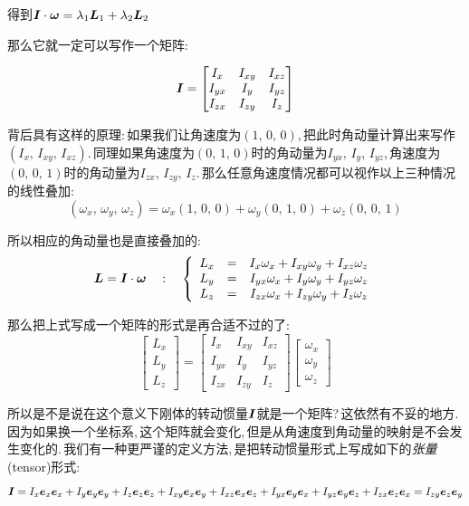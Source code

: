 得到$\boldsymbol{I}\cdot\boldsymbol{\omega}=\lambda_1 \boldsymbol{L}_1+\lambda_2 \boldsymbol{L}_2$

那么它就一定可以写作一个矩阵:

\[\boldsymbol{I}=\begin{bmatrix}I_{x}&I_{xy}&I_{xz}\\I_{yx}&I_{y}&I_{yz}\\I_{zx}&I_{zy}&I_{z}\end{bmatrix}\]

背后具有这样的原理:\,如果我们让角速度为$(1,\,0,\,0)$,\,把此时角动量计算出来写作$(I_x,\,I_{xy},\,I_{xz})$.\,同理如果角速度为$(0,\,1,\,0)$时的角动量为$I_{yx},\,I_{y},\,I_{yz}$,\,角速度为$(0,\,0,\,1)$时的角动量为$I_{zx},\,I_{zy},\,I_{z}$.\,那么任意角速度情况都可以视作以上三种情况的线性叠加:
\[(\omega_x,\,\omega_y,\,\omega_z)=\omega_x(1,\,0,\,0)+\omega_y(0,\,1,\,0)+\omega_z(0,\,0,\,1)\]

所以相应的角动量也是直接叠加的:
\[\boldsymbol{L}=\boldsymbol{I}\cdot\boldsymbol{\omega}\quad :\quad \left\{\begin{array}{ccc}L_x &=& I_{x}\omega_x+I_{xy}\omega_y+I_{xz}\omega_z\\L_y &=& I_{yx}\omega_x+I_{y}\omega_y+I_{yz}\omega_z\\L_z &=& I_{zx}\omega_x+I_{zy}\omega_y+I_{z}\omega_z\end{array}\right.\]

那么把上式写成一个矩阵的形式是再合适不过的了:
\[\begin{bmatrix}L_{x}\\L_{y}\\L_{z}\end{bmatrix}=\begin{bmatrix}I_{x}&I_{xy}&I_{xz}\\I_{yx}&I_{y}&I_{yz}\\I_{zx}&I_{zy}&I_{z}\end{bmatrix}\begin{bmatrix}\omega_{x}\\\omega_{y}\\\omega_{z}\end{bmatrix}\]

所以是不是说在这个意义下刚体的转动惯量$\boldsymbol{I}$就是一个矩阵?\,这依然有不妥的地方.\,因为如果换一个坐标系,\,这个矩阵就会变化,\,但是从角速度到角动量的映射是不会发生变化的.\,我们有一种更严谨的定义方法,\,是把转动惯量形式上写成如下的\emph{张量}(tensor)形式:
\[\boldsymbol{I}=I_x\boldsymbol{e}_x\boldsymbol{e}_x+I_y\boldsymbol{e}_y\boldsymbol{e}_y+I_z\boldsymbol{e}_z\boldsymbol{e}_z+I_{xy}\boldsymbol{e}_x\boldsymbol{e}_y+I_{xz}\boldsymbol{e}_x\boldsymbol{e}_z+I_{yx}\boldsymbol{e}_y\boldsymbol{e}_x+I_{yz}\boldsymbol{e}_y\boldsymbol{e}_z+I_{zx}\boldsymbol{e}_z\boldsymbol{e}_x=I_{zy}\boldsymbol{e}_z\boldsymbol{e}_y\]

